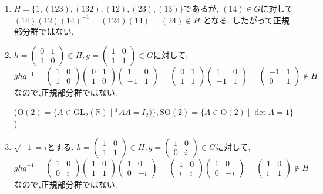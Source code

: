 \begin{enumerate}[label=(\arabic*)\;]
	\item $H=\{1,(123),(132),(12),(23),(13)\}$であるが,
		$(14) \in G$に対して$(14)(12)(14)^{-1}=(124)(14)=(24) \notin H$
		となる. したがって正規部分群ではない.
	\item $h=\begin{pmatrix}0&1\\1&0\end{pmatrix}\in H,
		g=\begin{pmatrix}1&0\\1&1\end{pmatrix}\in G$に対して,
		\[ghg^{-1}=\begin{pmatrix}1&0\\1&0\end{pmatrix}
		\begin{pmatrix}0&1\\1&0\end{pmatrix}
		\begin{pmatrix}1&0\\-1&1\end{pmatrix}
		=\begin{pmatrix}0&1\\1&1\end{pmatrix}
		\begin{pmatrix}1&0\\-1&1\end{pmatrix}
		=\begin{pmatrix}-1&1\\0&1\end{pmatrix} \notin H\]
		なので,正規部分群ではない.

		($\mathrm{O}(2)=\{A\in \mathrm{GL}_2(\mathbb{R})\mid {}^TAA=I_2)\},
		\mathrm{SO}(2)=\{A \in \mathrm{O}(2)\mid \det A=1\}$)
	\item $\sqrt{-1}=i$とする.
		$h=\begin{pmatrix}1&0\\1&1\end{pmatrix}\in H,
		g=\begin{pmatrix}1&0\\0&i\end{pmatrix}\in G$に対して,
		\[ghg^{-1}=\begin{pmatrix}1&0\\0&i\end{pmatrix}
		\begin{pmatrix}1&0\\1&1\end{pmatrix}
		\begin{pmatrix}1&0\\0&-i\end{pmatrix}
		=\begin{pmatrix}1&0\\i&i\end{pmatrix}
		\begin{pmatrix}1&0\\0&-i\end{pmatrix}
		=\begin{pmatrix}1&0\\i&1\end{pmatrix} \notin H\]
		なので,正規部分群ではない.


\end{enumerate}
